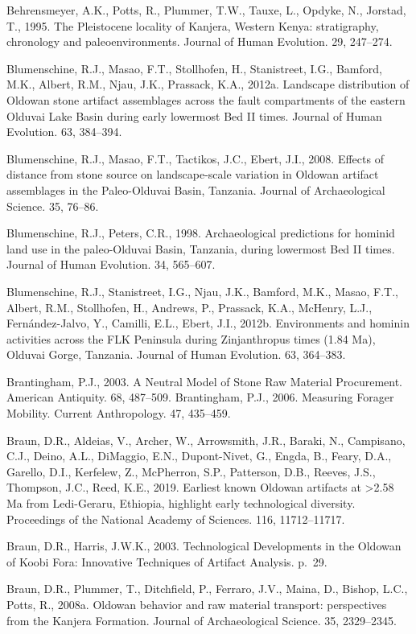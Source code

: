 \documentclass[]{elsarticle} %
\begin{document}
Behrensmeyer, A.K., Potts, R., Plummer, T.W., Tauxe, L., Opdyke, N.,
Jorstad, T., 1995. The Pleistocene locality of Kanjera, Western Kenya:
stratigraphy, chronology and paleoenvironments. Journal of Human
Evolution. 29, 247--274.

Blumenschine, R.J., Masao, F.T., Stollhofen, H., Stanistreet, I.G.,
Bamford, M.K., Albert, R.M., Njau, J.K., Prassack, K.A., 2012a.
Landscape distribution of Oldowan stone artifact assemblages across the
fault compartments of the eastern Olduvai Lake Basin during early
lowermost Bed II times. Journal of Human Evolution. 63, 384--394.

Blumenschine, R.J., Masao, F.T., Tactikos, J.C., Ebert, J.I., 2008.
Effects of distance from stone source on landscape-scale variation in
Oldowan artifact assemblages in the Paleo-Olduvai Basin, Tanzania.
Journal of Archaeological Science. 35, 76--86.

Blumenschine, R.J., Peters, C.R., 1998. Archaeological predictions for
hominid land use in the paleo-Olduvai Basin, Tanzania, during lowermost
Bed II times. Journal of Human Evolution. 34, 565--607.

Blumenschine, R.J., Stanistreet, I.G., Njau, J.K., Bamford, M.K., Masao,
F.T., Albert, R.M., Stollhofen, H., Andrews, P., Prassack, K.A.,
McHenry, L.J., Fernández-Jalvo, Y., Camilli, E.L., Ebert, J.I., 2012b.
Environments and hominin activities across the FLK Peninsula during
Zinjanthropus times (1.84 Ma), Olduvai Gorge, Tanzania. Journal of Human
Evolution. 63, 364--383.

Brantingham, P.J., 2003. A Neutral Model of Stone Raw Material
Procurement. American Antiquity. 68, 487--509. Brantingham, P.J., 2006.
Measuring Forager Mobility. Current Anthropology. 47, 435--459.

Braun, D.R., Aldeias, V., Archer, W., Arrowsmith, J.R., Baraki, N.,
Campisano, C.J., Deino, A.L., DiMaggio, E.N., Dupont-Nivet, G., Engda,
B., Feary, D.A., Garello, D.I., Kerfelew, Z., McPherron, S.P.,
Patterson, D.B., Reeves, J.S., Thompson, J.C., Reed, K.E., 2019.
Earliest known Oldowan artifacts at \textgreater{}2.58 Ma from
Ledi-Geraru, Ethiopia, highlight early technological diversity.
Proceedings of the National Academy of Sciences. 116, 11712--11717.

Braun, D.R., Harris, J.W.K., 2003. Technological Developments in the
Oldowan of Koobi Fora: Innovative Techniques of Artifact Analysis.
p.~29.

Braun, D.R., Plummer, T., Ditchfield, P., Ferraro, J.V., Maina, D.,
Bishop, L.C., Potts, R., 2008a. Oldowan behavior and raw material
transport: perspectives from the Kanjera Formation. Journal of
Archaeological Science. 35, 2329--2345.
\end{document}
